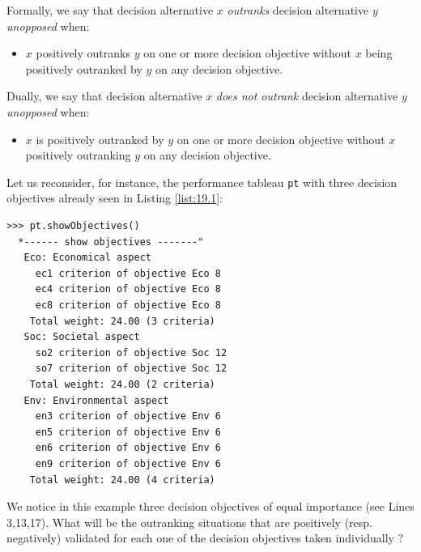 Formally, we say that decision alternative $x$ \emph{outranks} decision alternative $y$ \emph{unopposed} when:
\begin{itemize}[nosep]
\item [] $x$ positively outranks $y$ on one or more decision objective without $x$ being positively outranked by $y$ on any decision objective.
\end{itemize}
Dually, we say that decision alternative $x$ \emph{does not outrank} decision alternative $y$ \emph{unopposed} when:
\begin{itemize}[nosep]
\item [] $x$ is positively outranked by $y$ on one or more decision objective without $x$ positively outranking $y$ on any decision objective.
\end{itemize}

Let us reconsider, for instance, the performance tableau \texttt{pt} with three decision objectives already seen in Listing \ref{list:19.1}:
\begin{lstlisting}
>>> pt.showObjectives()
  *------ show objectives -------"
   Eco: Economical aspect
     ec1 criterion of objective Eco 8
     ec4 criterion of objective Eco 8
     ec8 criterion of objective Eco 8
    Total weight: 24.00 (3 criteria)
   Soc: Societal aspect
     so2 criterion of objective Soc 12
     so7 criterion of objective Soc 12
    Total weight: 24.00 (2 criteria)
   Env: Environmental aspect
     en3 criterion of objective Env 6
     en5 criterion of objective Env 6
     en6 criterion of objective Env 6
     en9 criterion of objective Env 6
    Total weight: 24.00 (4 criteria)
\end{lstlisting}
We notice in this example three decision objectives of equal importance (see Lines 3,13,17). What will be the outranking situations that are positively (resp.  negatively) validated for each one of the decision objectives taken individually ?

